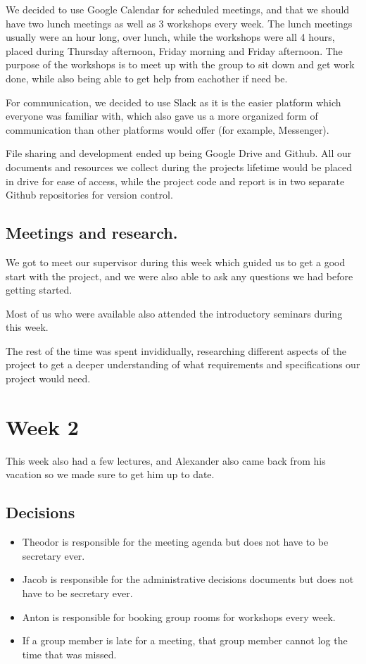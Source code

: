 \documentclass[11pt]{article}
\begin{document}
We decided to use Google Calendar for scheduled meetings, and that we should
have two lunch meetings as well as 3 workshops every week. The lunch meetings
usually were an hour long, over lunch, while the workshops were all 4 hours,
placed during Thursday afternoon, Friday morning and Friday afternoon.
The purpose of the workshops is to meet up with the group to sit down and get
work done, while also being able to get help from eachother if need be.

For communication, we decided to use Slack as it is the easier
platform which everyone was familiar with, which also gave us a more organized
form of communication than other platforms would offer (for example, Messenger).

File sharing and development ended up being Google Drive and Github. All our
documents and resources we collect during the projects lifetime would be placed
in drive for ease of access, while the project code and report is in two
separate Github repositories for version control.

\subsection*{Meetings and research.}
\label{sec:orgc946633}
We got to meet our supervisor during this week which guided us to get a good
start with the project, and we were also able to ask any questions we had before
getting started.

Most of us who were available also attended the introductory seminars during
this week.

The rest of the time was spent invididually, researching different aspects of
the project to get a deeper understanding of what requirements and
specifications our project would need.

\section*{Week 2}
\label{sec:orgf7d1bf6}
This week also had a few lectures, and Alexander also came back from his
vacation so we made sure to get him up to date.

\subsection*{Decisions}
\label{sec:org2b84563}
\begin{decisions}
\begin{itemize}
\item Theodor is responsible for the meeting agenda but does not have to be
secretary ever.
\item Jacob is responsible for the administrative decisions documents but does not
have to be secretary ever.
\item Anton is responsible for booking group rooms for workshops every week.
\item If a group member is late for a meeting, that group member cannot log the time
that was missed.
\end{itemize}
\end{decisions}
\end{document}
